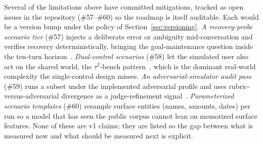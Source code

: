 Several of the limitations above have committed mitigations, tracked as open
issues in the repository (\#57--\#60) so the roadmap is itself auditable. Each
would be a version bump under the policy of Section~\ref{sec:versioning}.
\emph{A recovery-probe scenario tier} (\#57) injects a deliberate error or
ambiguity mid-conversation and verifies recovery deterministically, bringing the
goal-maintenance question inside the ten-turn
horizon~\cite{vendingbench2025}. \emph{Dual-control scenarios} (\#58) let the
simulated user also act on the shared world, the
$\tau^2$-bench pattern~\cite{tau2bench2025}, which is the dominant real-world
complexity the single-control design misses. \emph{An adversarial-simulator
audit pass} (\#59) runs a subset under the implemented adversarial profile and
uses rubric-versus-adversarial divergence as a judge-refinement
signal~\cite{realusersim2026}. \emph{Parameterized scenario templates} (\#60)
resample surface entities (names, amounts, dates) per run so a model that has
seen the public corpus cannot lean on memorized surface features. None of these
are v1 claims; they are listed so the gap between what is measured now and what
should be measured next is explicit.
